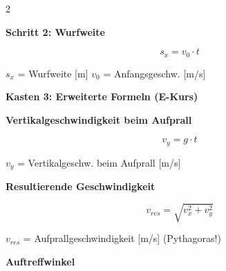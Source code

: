\documentclass[10pt, a4paper]{article}
\newcommand{\fachfarbe}{physik}
\newcommand{\abschnitt}[1]{%
    \vspace{8pt}
    \noindent\textbf{\textcolor{\fachfarbe}{#1}}
    \vspace{4pt}
}
\begin{document}
\begin{multicols}{2}
\vspace{4pt}

\begin{formelbox}
\textbf{Schritt 2: Wurfweite}
\vspace{2pt}

\begin{equation*}
s_x = v_0 \cdot t
\end{equation*}

\vspace{2pt}
\footnotesize
$s_x$ = Wurfweite [m] \quad $v_0$ = Anfangsgeschw. [m/s]
\end{formelbox}

\vspace{4pt}


\abschnitt{Kasten 3: Erweiterte Formeln (E-Kurs)}

\begin{formelbox}
\textbf{Vertikalgeschwindigkeit beim Aufprall}
\vspace{2pt}

\begin{equation*}
v_y = g \cdot t
\end{equation*}

\vspace{2pt}
\footnotesize
$v_y$ = Vertikalgeschw. beim Aufprall [m/s]
\end{formelbox}

\vspace{4pt}

\begin{formelbox}
\textbf{Resultierende Geschwindigkeit}
\vspace{2pt}

\begin{equation*}
v_{res} = \sqrt{v_x^2 + v_y^2}
\end{equation*}

\vspace{2pt}
\footnotesize
$v_{res}$ = Aufprallgeschwindigkeit [m/s] \quad (Pythagoras!)
\end{formelbox}

\vspace{4pt}

\begin{formelbox}
\textbf{Auftreffwinkel}
\vspace{2pt}


\end{formelbox}
\end{multicols}
\end{document}
